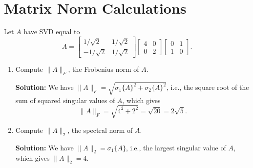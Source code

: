\documentclass[10pt]{article}
\begin{document}
\section{Matrix Norm Calculations}

Let $A$ have SVD equal to
\begin{equation}
A = \begin{bmatrix} 1/\sqrt{2} & 1/\sqrt{2} \\ -1/\sqrt{2} & 1/\sqrt{2} \end{bmatrix} \begin{bmatrix} 4 & 0 \\ 0 & 2 \end{bmatrix} \begin{bmatrix} 0 & 1 \\ 1 & 0 \end{bmatrix}.
\end{equation}

\begin{enumerate}[label=(\alph*)]
\item Compute $\|A\|_F$, the Frobenius norm of $A$.

\textbf{Solution:} We have $\|A\|_F = \sqrt{\sigma_1\{A\}^2 + \sigma_2\{A\}^2}$, i.e., the square root of the sum of squared singular values of $A$, which gives
\begin{equation}
\|A\|_F = \sqrt{4^2 + 2^2} = \sqrt{20} = 2\sqrt{5}.
\end{equation}

\item Compute $\|A\|_2$, the spectral norm of $A$.

\textbf{Solution:} We have $\|A\|_2 = \sigma_1\{A\}$, i.e., the largest singular value of $A$, which gives $\|A\|_2 = 4$.
\end{enumerate}
\end{document}
